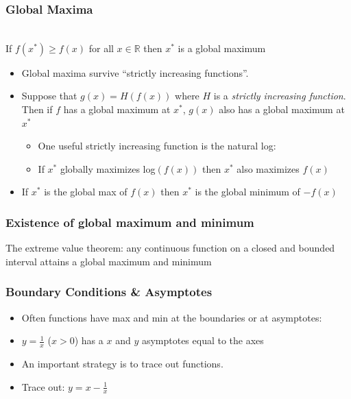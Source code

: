 \documentclass[aspectratio=169]{beamer}
\numberwithin{equation}{section}
\begin{document}
\begin{frame}
\frametitle{Global Maxima}

\ \\If $f(x^*)\geq f(x)$ for all $x\in \mathbb{R}$ then $x^*$ is a global maximum \pause

\begin{itemize}
\item Global maxima survive ``strictly increasing functions''.\pause
\item[-] Suppose that $g(x)=H(f(x))$ where $H$ is a \textit{strictly increasing function}.  Then if $f$ has a global maximum at $x^*$, $g(x)$ also has a global maximum at $x^*$ \pause
\begin{itemize}
\item One useful strictly increasing function is the natural log:
\item If $x^*$ globally maximizes log$(f(x))$ then $x^*$ also maximizes $f(x)$ \pause
\end{itemize}

\item If $x^*$ is the global max of $f(x)$ then $x^*$ is the global minimum of $-f(x)$ \pause
\end{itemize}

\end{frame}



\begin{frame}
\frametitle{Existence of global maximum and minimum}

\begin{theorem}
The extreme value theorem:  any continuous function on a closed and bounded interval attains a global maximum and minimum
\end{theorem} \pause

\end{frame}

\begin{frame}
\frametitle{Boundary Conditions \& Asymptotes}

\begin{itemize}
\item Often functions have max and min at the boundaries or at asymptotes:
\item[] $y={\frac{1}{x}}$ ($x>0$) has a $x$ and $y$ asymptotes equal to the axes \pause
\item An important strategy is to trace out functions.
\item[] Trace out: $y=x-{\frac{1}{x}}$ %
\end{itemize}

\end{frame}
\end{document}
